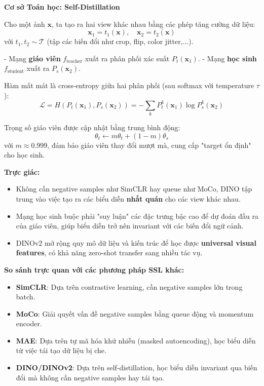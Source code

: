\textbf{Cơ sở Toán học: Self-Distillation}

Cho một ảnh $\mathbf{x}$, ta tạo ra hai view khác nhau bằng các phép tăng cường dữ liệu:
\[
\mathbf{x}_1 = t_1(\mathbf{x}), \quad \mathbf{x}_2 = t_2(\mathbf{x})
\]
với $t_1, t_2 \sim \mathcal{T}$ (tập các biến đổi như crop, flip, color jitter,...).

- Mạng \textbf{giáo viên} $f_\text{teacher}$ xuất ra phân phối xác suất $P_t(\mathbf{x}_1)$.
- Mạng \textbf{học sinh} $f_\text{student}$ xuất ra $P_s(\mathbf{x}_2)$.

Hàm mất mát là cross-entropy giữa hai phân phối (sau softmax với temperature $\tau$):
\[
\mathcal{L} = H(P_t(\mathbf{x}_1), P_s(\mathbf{x}_2)) = - \sum_k P_t^k(\mathbf{x}_1) \log P_s^k(\mathbf{x}_2)
\]

Trọng số giáo viên được cập nhật bằng trung bình động:
\[
\theta_t \leftarrow m \theta_t + (1-m) \theta_s
\]
với $m \approx 0.999$, đảm bảo giáo viên thay đổi mượt mà, cung cấp "target ổn định" cho học sinh.

\textbf{Trực giác:}
\begin{itemize}
	\item Không cần negative samples như SimCLR hay queue như MoCo, DINO tập trung vào việc tạo ra các biểu diễn \textbf{nhất quán} cho các view khác nhau.
	\item Mạng học sinh buộc phải "suy luận" các đặc trưng bậc cao để dự đoán đầu ra của giáo viên, giúp biểu diễn trở nên invariant với các biến đổi ngữ cảnh.
	\item DINOv2 mở rộng quy mô dữ liệu và kiến trúc để học được \textbf{universal visual features}, có khả năng zero-shot transfer sang nhiều tác vụ.
\end{itemize}

\textbf{So sánh trực quan với các phương pháp SSL khác:}
\begin{itemize}
	\item \textbf{SimCLR}: Dựa trên contrastive learning, cần negative samples lớn trong batch.
	\item \textbf{MoCo}: Giải quyết vấn đề negative samples bằng queue động và momentum encoder.
	\item \textbf{MAE}: Dựa trên tự mã hóa khử nhiễu (masked autoencoding), học biểu diễn từ việc tái tạo dữ liệu bị che.
	\item \textbf{DINO/DINOv2}: Dựa trên self-distillation, học biểu diễn invariant qua biến đổi mà không cần negative samples hay tái tạo.
\end{itemize}


